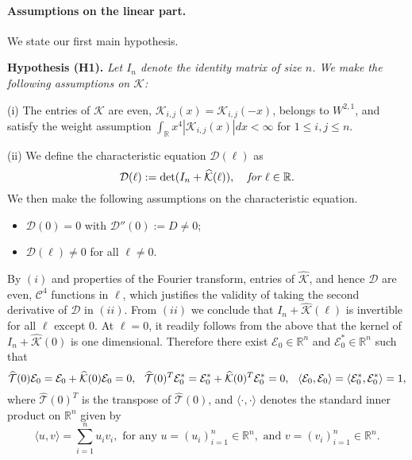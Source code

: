 \documentclass[letterpaper,11pt]{article}
\newcommand{\R}{\mathbb{R}}
\newcommand{\K}{\mathcal{K}}
\numberwithin{equation}{section}
\newenvironment{Hypothesis}[1]%
  {\begin{trivlist}\item[]{\bf Hypothesis #1 }\em}{\end{trivlist}}
\theoremstyle{plain}
\theoremstyle{remark}
\begin{document}
\paragraph{Assumptions on the linear part.}We state our first main hypothesis.
\begin{Hypothesis}{(H1).}Let $I_n$ denote the identity matrix of size $n$. We make the following assumptions on $\K$:
\item (i)  The entries of $\K$ are even, $\K_{i,j}(x)=\K_{i,j}(-x)$, belongs to $W^{2,1}$, and satisfy the weight assumption $\int_{\mathbb{R}} x^{4}|\K_{i,j}(x)| dx<\infty$ for $1\le i,j\le n$.

\item [(ii)] We define the characteristic equation $\mathcal{D}(\ell)$ as
\[\mathcal{D}(\ell) := \det(I_n+\widehat{\K}(\ell)),\hspace{0.1in} \textit{ for } \ell \in \R.\] We then make the following assumptions on the characteristic equation.
\begin{itemize}
\item $\mathcal{D}(0)= 0$ with $\mathcal{D}''(0) := D \neq 0$;
\item $\mathcal{D}(\ell) \neq 0$ for all $\ell \neq 0$.
\end{itemize}
\end{Hypothesis}


By $(i)$ and properties of the Fourier transform, entries of $\widehat{\K}$, and hence $\mathcal{D}$ are even, $\mathscr{C}^4$ functions in $\ell$, which justifies the validity of taking the second derivative of $\mathcal{D}$ in $(ii)$. From $(ii)$ we conclude that $I_n+\widehat{\K}(\ell)$ is invertible for all $\ell$ except $0$. At $\ell = 0$, it readily follows from the above that the kernel of $I_n + \widehat{\K}(0)$ is one dimensional. Therefore there exist $\mathcal{E}_0\in \R^n$ and $\mathcal{E}_0^* \in \R^n$ such that
\[
\widehat{\mathcal{T}}(0)\mathcal{E}_0 = \mathcal{E}_0+\widehat{\K}(0) \mathcal{E}_0 = 0,  \hspace{0.1in} \widehat{\mathcal{T}}(0)^T\mathcal{E}_0^* = \mathcal{E}_0^*+\widehat{\K}(0)^T \mathcal{E}_0^* =0, \hspace{0.1in} \langle \mathcal{E}_0, \mathcal{E}_0\rangle = \langle \mathcal{E}_0^*, \mathcal{E}_0^*\rangle = 1,
\]
where $\widehat{\mathcal{T}}(0)^T$ is the transpose of $\widehat{\mathcal{T}}(0)$, and $\langle \cdot,\cdot \rangle$ denotes the standard inner product on $\R^n$ given by
\[
\langle u,v\rangle = \sum_{i=1}^{n} u_iv_i, \text{ for any }u=(u_i)_{i=1}^n\in \R^n, \text{ and }v=(v_i)_{i=1}^n \in \R^n.
\]
\end{document}
